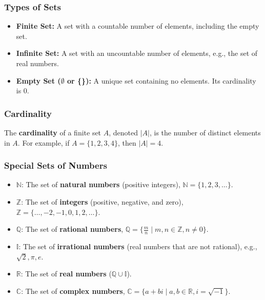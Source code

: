\documentclass{article}
\begin{document}
\subsubsection{Types of Sets}
\begin{itemize}
    \item \textbf{Finite Set:} A set with a countable number of elements, including the empty set.
    \item \textbf{Infinite Set:} A set with an uncountable number of elements, e.g., the set of real numbers.
    \item \textbf{Empty Set ($\emptyset$ or \{\}):} A unique set containing no elements. Its cardinality is 0.
\end{itemize}

\subsubsection{Cardinality}
The \textbf{cardinality} of a finite set $A$, denoted $|A|$, is the number of distinct elements in $A$. For example, if $A = \{1, 2, 3, 4\}$, then $|A| = 4$.

\subsubsection{Special Sets of Numbers}
\begin{itemize}
    \item $\mathbb{N}$: The set of \textbf{natural numbers} (positive integers), $\mathbb{N} = \{1, 2, 3, \dots\}$.
    \item $\mathbb{Z}$: The set of \textbf{integers} (positive, negative, and zero), $\mathbb{Z} = \{\dots, -2, -1, 0, 1, 2, \dots\}$.
    \item $\mathbb{Q}$: The set of \textbf{rational numbers}, $\mathbb{Q} = \{\frac{m}{n} \mid m, n \in \mathbb{Z}, n \neq 0\}$.
    \item $\mathbb{I}$: The set of \textbf{irrational numbers} (real numbers that are not rational), e.g., $\sqrt{2}, \pi, e$.
    \item $\mathbb{R}$: The set of \textbf{real numbers} ($\mathbb{Q} \cup \mathbb{I}$).
    \item $\mathbb{C}$: The set of \textbf{complex numbers}, $\mathbb{C} = \{a + bi \mid a, b \in \mathbb{R}, i = \sqrt{-1}\}$.
\end{itemize}
\end{document}
